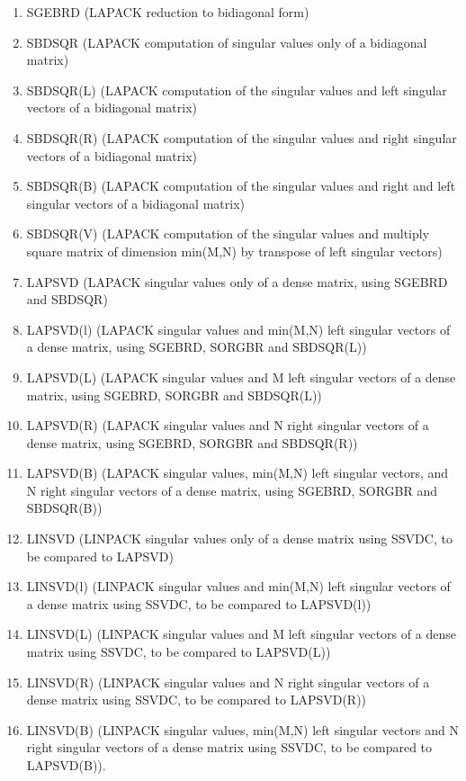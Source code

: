 \begin{enumerate}
\item SGEBRD (LAPACK reduction to bidiagonal form)
\item SBDSQR (LAPACK computation of singular values only of a bidiagonal
matrix)
\item SBDSQR(L) (LAPACK computation of the singular values and left 
singular vectors of a bidiagonal matrix)
\item SBDSQR(R) (LAPACK computation of the singular values and right 
singular vectors of a bidiagonal matrix)
\item SBDSQR(B) (LAPACK computation of the singular values and right and left
singular vectors of a bidiagonal matrix)
\item SBDSQR(V) (LAPACK computation of the singular values and multiply
square matrix of dimension min({\rm M},{\rm N}) by transpose of left singular vectors)
\item LAPSVD (LAPACK singular values only of a dense matrix, using SGEBRD
and SBDSQR)
\item LAPSVD(l) (LAPACK singular values and min({\rm M},{\rm N}) left singular vectors
of a dense matrix, using SGEBRD, SORGBR and SBDSQR(L))
\item LAPSVD(L) (LAPACK singular values and {\rm M} left singular vectors
of a dense matrix, using SGEBRD, SORGBR and SBDSQR(L))
\item LAPSVD(R) (LAPACK singular values and {\rm N} right singular vectors
of a dense matrix, using SGEBRD, SORGBR and SBDSQR(R))
\item LAPSVD(B) (LAPACK singular values, min({\rm M},{\rm N}) left singular vectors,
and {\rm N} right singular vectors of a dense matrix, using SGEBRD, SORGBR 
and SBDSQR(B))
\item LINSVD (LINPACK singular values only of a dense matrix using SSVDC,
to be compared to LAPSVD)
\item LINSVD(l) (LINPACK singular values and min({\rm M},{\rm N}) left singular vectors
of a dense matrix using SSVDC, to be compared to LAPSVD(l))
\item LINSVD(L) (LINPACK singular values and {\rm M} left singular vectors
of a dense matrix using SSVDC, to be compared to LAPSVD(L))
\item LINSVD(R) (LINPACK singular values and {\rm N} right singular vectors
of a dense matrix using SSVDC, to be compared to LAPSVD(R))
\item LINSVD(B) (LINPACK singular values, min({\rm M},{\rm N}) left singular vectors
and {\rm N} right singular vectors of a dense matrix using SSVDC, to be compared 
to LAPSVD(B)).
\end{enumerate}

